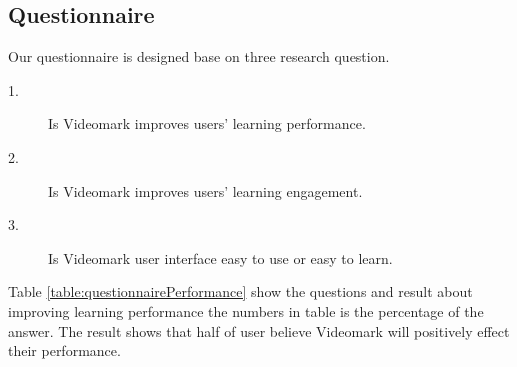 \subsection{Questionnaire}
Our questionnaire is designed base on three research question.
\begin{description}
  \item[1.] Is Videomark improves users' learning performance.
  \item[2.] Is Videomark improves users' learning engagement.
  \item[3.] Is Videomark user interface easy to use or easy to learn.
\end{description}

Table \ref{table:questionnairePerformance} show the questions and result about improving learning performance the numbers in table is the percentage of the answer.
The result shows that half of user believe Videomark will positively effect their performance.

\begin{CJK*}{UTF8}{bsmi}
\begin{table}[H]
\centering
\caption{Performance of Learning}
\label{table:questionnairePerformance}
\end{table}
\end{CJK*}

